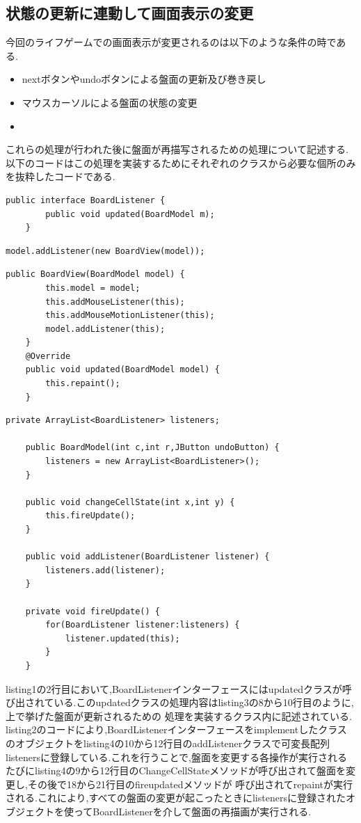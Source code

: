 \documentclass[dvipdfmx]{jarticle}
\begin{document}
\subsection{状態の更新に連動して画面表示の変更}
今回のライフゲームでの画面表示が変更されるのは以下のような条件の時である.
\begin{itemize}
    \item nextボタンやundoボタンによる盤面の更新及び巻き戻し
    \item マウスカーソルによる盤面の状態の変更
    \item 
\end{itemize}
これらの処理が行われた後に盤面が再描写されるための処理について記述する.\\
以下のコードはこの処理を実装するためにそれぞれのクラスから必要な個所のみを抜粋したコードである.
\begin{lstlisting}[caption=BoardListenerインターフェース,label=fuga]
    public interface BoardListener {
	    public void updated(BoardModel m);
    }
\end{lstlisting}
\begin{lstlisting}[caption=Mainクラス,label=fuga]
    model.addListener(new BoardView(model));
\end{lstlisting}
\begin{lstlisting}[caption=BoardViewクラス,label=fuga]
    public BoardView(BoardModel model) {
		this.model = model;
		this.addMouseListener(this);
		this.addMouseMotionListener(this);
		model.addListener(this);
	}
    @Override
	public void updated(BoardModel model) {
		this.repaint();
	}
\end{lstlisting}
\begin{lstlisting}[caption=BoardModelクラス,label=fuga]
    private ArrayList<BoardListener> listeners;

    public BoardModel(int c,int r,JButton undoButton) {
		listeners = new ArrayList<BoardListener>();
	}

    public void changeCellState(int x,int y) {
		this.fireUpdate();
	}

    public void addListener(BoardListener listener) {
		listeners.add(listener);
	}
	
	private void fireUpdate() {
		for(BoardListener listener:listeners) {
			listener.updated(this);
		}
	}
\end{lstlisting}
listing1の2行目において,BoardListenerインターフェースにはupdatedクラスが呼び出されている.このupdatedクラスの処理内容はlisting3の8から10行目のように,上で挙げた盤面が更新されるための
処理を実装するクラス内に記述されている.
listing2のコードにより,BoardListenerインターフェースをimplementしたクラスのオブジェクトをlisting4の10から12行目のaddListenerクラスで可変長配列
listenersに登録している.これを行うことで,盤面を変更する各操作が実行されるたびにlisting4の9から12行目のChangeCellStateメソッドが呼び出されて盤面を変更し,その後で18から21行目のfireupdatedメソッドが
呼び出されてrepaintが実行される.これにより,すべての盤面の変更が起こったときにlistenersに登録されたオブジェクトを使ってBoardListenerを介して盤面の再描画が実行される.
\end{document}
